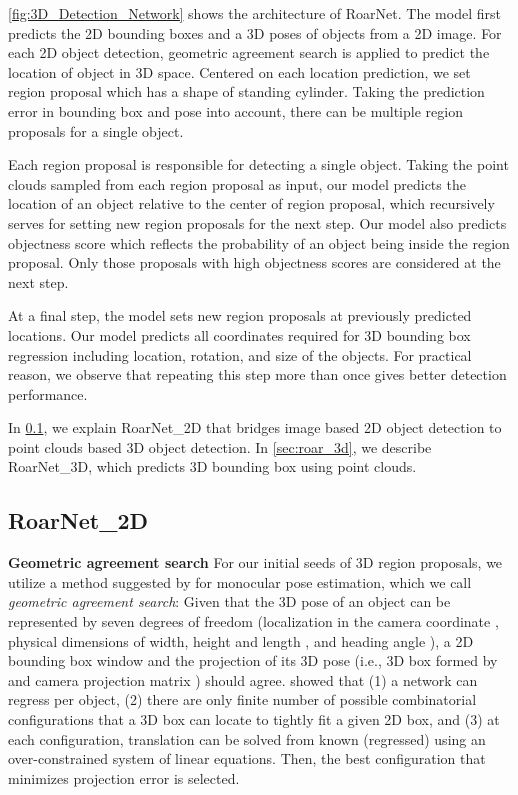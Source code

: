 \documentclass[letterpaper, 10 pt, conference]{ieeeconf}
\newcommand{\subsec}{\quad}
\begin{document}
\cref{fig:3D_Detection_Network} shows the architecture of RoarNet. The model first predicts the 2D bounding boxes and a 3D poses of objects from a 2D image. For each 2D object detection, geometric agreement search is applied to predict the location of object in 3D space.
Centered on each location prediction, we set region proposal which has a shape of standing cylinder. Taking the prediction error in bounding box and pose into account, there can be multiple region proposals for a single object.


Each region proposal is responsible for detecting a single object. Taking the point clouds sampled from each region proposal as input, our model predicts the location of an object relative to the center of region proposal, which recursively serves for setting new region proposals for the next step. Our model also predicts objectness score which reflects the probability of an object being inside the region proposal. Only those proposals with high objectness scores are considered at the next step.

At a final step, the model sets new region proposals at previously predicted locations.
Our model predicts all coordinates required for 3D bounding box regression including location, rotation, and size of the objects.
For practical reason, we observe that repeating this step more than once gives better detection performance.






In \cref{sec:roar_2d}, we explain RoarNet\_2D that bridges image based 2D object detection to point clouds based 3D object detection. In \cref{sec:roar_3d}, we describe RoarNet\_3D, which predicts 3D bounding box using point clouds.

\subsection{RoarNet\_2D} \label{sec:roar_2d}
\textbf{Geometric agreement search\subsec}
For our initial seeds of 3D region proposals, we utilize a method suggested by \cite{mousavian_3d_2017} for monocular pose estimation, which we call \emph{geometric agreement search}:
Given that the 3D pose of an object can be represented by seven degrees of freedom (localization in the camera coordinate , physical dimensions of width, height and length , and heading angle ), a 2D bounding box window and the projection of its 3D pose (i.e., 3D box formed by  and camera projection matrix ) should agree. \cite{mousavian_3d_2017} showed that (1) a network can regress  per object, (2) there are only finite number of possible combinatorial configurations that a 3D box can locate to tightly fit a given 2D box, and (3) at each configuration, translation  can be solved from known (regressed)  using an over-constrained system of linear equations. Then, the best configuration that minimizes projection error is selected.
\end{document}
